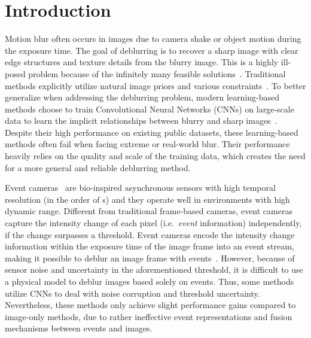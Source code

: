 \documentclass[runningheads]{llncs}
\newlength \g
\begin{document}
\section{Introduction}
\label{sec:intro}

Motion blur often occurs in images due to camera shake or object motion during the exposure time. The goal of deblurring is to recover a sharp image with clear edge structures and texture details from the blurry image. This is a highly ill-posed problem because of the infinitely many feasible solutions~\cite{bahat2017non,cho2009fast,zhang2017beyond}. Traditional methods explicitly utilize natural image priors and various constraints~\cite{bahat2017non,fergus2006removing,kotera2013blind,krishnan2011blind,levin2009understanding,levin2011efficient,xu2013unnatural}. To better generalize when addressing the deblurring problem, modern learning-based methods choose to train Convolutional Neural Networks (CNNs) on large-scale data to learn the implicit relationships between blurry and sharp images~\cite{gong2017motion,nah2017deep,sun2015learning,tao2018scale,zhang2018dynamic}. Despite their high performance on existing public datasets, these learning-based methods often fail when facing extreme or real-world blur. Their performance heavily relies on the quality and scale of the training data, which creates the need for a more general and reliable deblurring method.


Event cameras~\cite{brandli2014240,gallego2020event,patrick2008128x} are bio-inspired asynchronous sensors with high temporal resolution (in the order of s) and they operate well in environments with high dynamic range. Different from traditional frame-based cameras, event cameras capture the intensity change of each pixel (i.e.\ \emph{event} information) independently, if the change surpasses a threshold. Event cameras encode the intensity change information within the exposure time of the image frame into an event stream, making it possible to deblur an image frame with events~\cite{pan2019bringing_high_framerate}. However, because of sensor noise and uncertainty in the aforementioned threshold, it is difficult to use a physical model to deblur images based solely on events. Thus, some methods~\cite{jiang2020learning_event_motion_deblur,lin2020learning_event_video_deblur,shang2021bringing} utilize CNNs to deal with noise corruption and threshold uncertainty. Nevertheless, these methods only achieve slight performance gains compared to image-only methods, due to rather ineffective event representations and fusion mechanisms between events and images.
\end{document}
